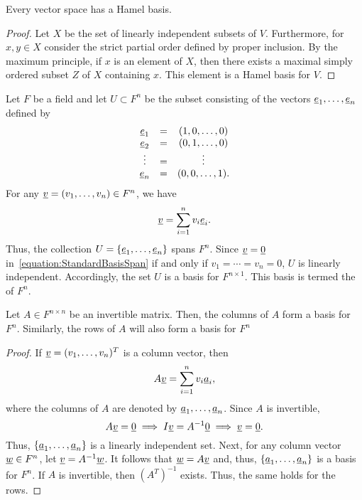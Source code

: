 \begin{theorem}
Every vector space has a Hamel basis.
\end{theorem}
\begin{proof}
Let $X$ be the set of linearly independent subsets of $V$.
Furthermore, for $x, y \in X$ consider the strict partial order defined by proper inclusion.
By the maximum principle, if $x$ is an element of $X$, then there exists a maximal simply ordered subset $Z$ of $X$ containing $x$.
This element is a Hamel basis for $V$.
\end{proof}

\begin{example}
Let $F$ be a field and let $U \subset F^n$ be the subset consisting of the vectors $\underline{e}_1, \ldots, \underline{e}_n$ defined by
\begin{equation*}
\begin{array}{ccc}
\underline{e}_1 & = & (1, 0, \ldots, 0) \\
\underline{e}_2 & = & (0, 1, \ldots, 0) \\
\vdots & = & \vdots \\
\underline{e}_n & = & (0, 0, \ldots, 1).
\end{array}
\end{equation*}
For any $\underline{v} = (v_1, \ldots, v_n) \in F^n$, we have
\begin{equation} \label{equation:StandardBasisSpan}
\underline{v} = \sum_{i=1}^n v_i \underline{e}_i.
\end{equation}
Thus, the collection $U = \left\{ \underline{e}_1, \ldots, \underline{e}_n \right\}$ spans $F^n$.
Since $\underline{v} = \underline{0}$ in~\eqref{equation:StandardBasisSpan} if and only if $v_1 = \cdots = v_n = 0$, $U$ is linearly independent.
Accordingly, the set $U$ is a basis for $F^{n \times 1}$.
This basis is termed the  of $F^n$.
\end{example}

\begin{lemma}
Let $A\in F^{n \times n}$ be an invertible matrix.
Then, the columns of $A$ form a basis for $F^n$.
Similarly, the rows of $A$ will also form a basis for $F^n$
\end{lemma}
\begin{proof}
If $\underline{v} = (v_1, \ldots, v_n)^T$ is a column vector, then
\begin{equation*}
A \underline{v} = \sum_{i=1}^n v_i \underline{a}_i,
\end{equation*}
where the columns of $A$ are denoted by $\underline{a}_1, \ldots, \underline{a}_n$.
Since $A$ is invertible,
\begin{equation*}
A \underline{v} = \underline{0} \implies I \underline{v} = A^{-1} \underline{0} \implies \underline{v} = \underline{0}.
\end{equation*}
Thus, $\{ \underline{a}_1, \ldots, \underline{a}_n \}$ is a linearly independent set.
Next, for any column vector $\underline{w} \in F^n$, let $\underline{v} = A^{-1} \underline{w}$.
It follows that $\underline{w} = A \underline{v}$ and, thus, $\{ \underline{a}_1, \ldots, \underline{a}_n \}$ is a basis for $F^n$.
If $A$ is invertible, then $(A^T)^{-1}$ exists.
Thus, the same holds for the rows.
\end{proof}

